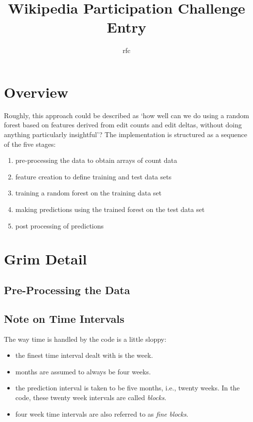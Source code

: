 \documentclass[12pt]{article}
\title{Wikipedia Participation Challenge Entry}
\author{rfc}
\begin{document}
\maketitle
\section{Overview}

Roughly, this approach could be described as `how well can we do using a random forest based on features derived from edit counts and edit deltas, without doing anything particularly insightful'? The implementation is structured as a sequence of the five stages:
\begin{enumerate}
	\item pre-processing the data to obtain arrays of count data
	\item feature creation to define training and test data sets
	\item training a random forest on the training data set
	\item making predictions using the trained forest on the test data set
	\item post processing of predictions
\end{enumerate}

\section{Grim Detail}

\subsection{Pre-Processing the Data}

\subsection{Note on Time Intervals}
The way time is handled by the code is a little sloppy:
\begin{itemize}
	\item the finest time interval dealt with is the week.
	\item months are assumed to always be four weeks.
	\item the prediction interval is taken to be five months, i.e., twenty weeks.
	In the code, these twenty week intervals are called \emph{blocks}.
	\item four week time intervals are also referred to as \emph{fine blocks}.
\end{itemize}
\end{document}
